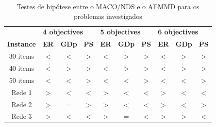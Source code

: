 \begin{table}[htb]
	\centering
	\def\arraystretch{1.0}
	\caption{Testes de hipótese entre o MACO/NDS e o AEMMD para os problemas investigados}
	\label{tab_ztest_meams}
	\begin{tabular}{cccccccccc}
		& \multicolumn{3}{l}{\textbf{4 objectives}} & \multicolumn{3}{l}{\textbf{5 objectives}} & \multicolumn{3}{l}{\textbf{6 objectives
		}} \\
		\textbf{Instance} & \textbf{ER} & \textbf{GDp} & \textbf{PS} & \textbf{ER} & \textbf{GDp} & \textbf{PS} & \textbf{ER} & \textbf{GDp} & \textbf{PS} \\ \hline
		30 items & \cellcolor{table-green} $<$ & \cellcolor{table-green} $<$ & \cellcolor{table-green} $>$ & \cellcolor{table-green} $<$ & \cellcolor{table-red} $>$ & \cellcolor{table-green} $>$ & \cellcolor{table-green} $<$ & \cellcolor{table-red} $>$ & \cellcolor{table-green} $>$ \\
		40 items & \cellcolor{table-green} $<$ & \cellcolor{table-red} $>$ & \cellcolor{table-green} $>$ & \cellcolor{table-green} $<$ & \cellcolor{table-red} $>$ & \cellcolor{table-green} $>$ & \cellcolor{table-green} $<$ & \cellcolor{table-red} $>$ & \cellcolor{table-green} $>$ \\
		50 items & \cellcolor{table-green} $<$ & \cellcolor{table-green} $<$ & \cellcolor{table-green} $>$ & \cellcolor{table-green} $<$ & \cellcolor{table-green} $<$ & \cellcolor{table-green} $>$ & \cellcolor{table-green} $<$ & \cellcolor{table-green} $<$ & \cellcolor{table-green} $>$ \\  \hline 
		Rede 1 & \cellcolor{table-red} $>$ & \cellcolor{table-green} $<$ & \cellcolor{table-red} $<$ & \cellcolor{table-red} $>$ & \cellcolor{table-green} $<$ & \cellcolor{table-red} $<$ & \cellcolor{table-red} $>$ & \cellcolor{table-green} $<$ & \cellcolor{table-red} $<$ \\
		Rede 2 & \cellcolor{table-red} $>$ & \cellcolor{white} $=$ & \cellcolor{table-green} $>$ & \cellcolor{table-red} $>$ & \cellcolor{table-green} $<$ & \cellcolor{table-red} $<$ & \cellcolor{table-red} $>$ & \cellcolor{table-green} $<$ & \cellcolor{table-green} $>$ \\
		Rede 3 & \cellcolor{table-red} $>$ & \cellcolor{table-green} $<$ & \cellcolor{table-red} $<$ & \cellcolor{table-red} $>$ & \cellcolor{white} $=$ & \cellcolor{table-red} $<$ & \cellcolor{table-red} $>$ & \cellcolor{table-red} $>$ & \cellcolor{table-red} $<$ \\  \hline 
	\end{tabular}
\end{table}

